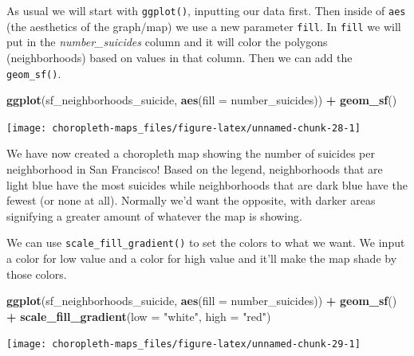 \documentclass[
  12pt,
]{book}
\newenvironment{Shaded}{\begin{snugshade}}{\end{snugshade}}
\newcommand{\DataTypeTok}[1]{\textcolor[rgb]{0.13,0.29,0.53}{#1}}
\newcommand{\KeywordTok}[1]{\textcolor[rgb]{0.13,0.29,0.53}{\textbf{#1}}}
\newcommand{\NormalTok}[1]{#1}
\newcommand{\OperatorTok}[1]{\textcolor[rgb]{0.81,0.36,0.00}{\textbf{#1}}}
\newcommand{\StringTok}[1]{\textcolor[rgb]{0.31,0.60,0.02}{#1}}
\begin{document}
As usual we will start with \texttt{ggplot()}, inputting our data first. Then inside of \texttt{aes} (the aesthetics of the graph/map) we use a new parameter \texttt{fill}. In \texttt{fill} we will put in the \emph{number\_suicides} column and it will color the polygons (neighborhoods) based on values in that column. Then we can add the \texttt{geom\_sf()}.

\begin{Shaded}
\begin{Highlighting}[]
\KeywordTok{ggplot}\NormalTok{(sf\_neighborhoods\_suicide, }\KeywordTok{aes}\NormalTok{(}\DataTypeTok{fill =}\NormalTok{ number\_suicides)) }\OperatorTok{+}
\StringTok{  }\KeywordTok{geom\_sf}\NormalTok{() }
\end{Highlighting}
\end{Shaded}

\begin{center}\texttt{[image: choropleth-maps\_files/figure-latex/unnamed-chunk-28-1]} \end{center}

We have now created a choropleth map showing the number of suicides per neighborhood in San Francisco! Based on the legend, neighborhoods that are light blue have the most suicides while neighborhoods that are dark blue have the fewest (or none at all). Normally we'd want the opposite, with darker areas signifying a greater amount of whatever the map is showing.

We can use \texttt{scale\_fill\_gradient()} to set the colors to what we want. We input a color for low value and a color for high value and it'll make the map shade by those colors.

\begin{Shaded}
\begin{Highlighting}[]
\KeywordTok{ggplot}\NormalTok{(sf\_neighborhoods\_suicide, }\KeywordTok{aes}\NormalTok{(}\DataTypeTok{fill =}\NormalTok{ number\_suicides)) }\OperatorTok{+}
\StringTok{  }\KeywordTok{geom\_sf}\NormalTok{() }\OperatorTok{+}
\StringTok{  }\KeywordTok{scale\_fill\_gradient}\NormalTok{(}\DataTypeTok{low =} \StringTok{"white"}\NormalTok{, }\DataTypeTok{high =} \StringTok{"red"}\NormalTok{) }
\end{Highlighting}
\end{Shaded}

\begin{center}\texttt{[image: choropleth-maps\_files/figure-latex/unnamed-chunk-29-1]} \end{center}
\end{document}
